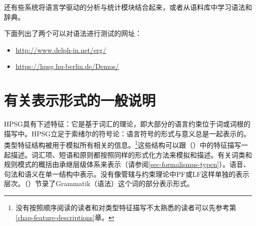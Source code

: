 还有些系统将语言学驱动的分析与统计模块结合起来\citep{Brew95a,MNT2005a-u,MT2008a-u}，或者从语料库中学习语法和辞典\citep{Fouvry2003a-u,CZ2009a-u}。

下面列出了两个可以对语法进行测试的网址：
\begin{itemize}
\item \url{http://www.delph-in.net/erg/}
\item \url{https://hpsg.hu-berlin.de/Demos/}
\end{itemize}


\section{有关表示形式的一般说明}

HPSG具有下述特征：它是基于词汇的理论，即大部分的语言约束位于词或词根的描写中。HPSG立足于索绪尔的符号论：语言符号的形式与意义总是一起表示的。类型特征结构被用于模拟所有相关的信息。\footnote{没有按照顺序阅读的读者和对类型特征描写不太熟悉的读者可以先参考第\ref{chap-feature-descriptions}章。
}这些结构可以跟（）中的特征描写一起描述。词汇项、短语和原则都按照同样的形式化方法来模拟和描述。有关词类和规则模式的概括由承继层级体系来表示（请参阅\ref{sec-formalismus-typen}）。语音、句法和语义在单一结构中表示。没有像管辖与约束理论中PF或LF这样单独的表示层次。（）节录了Grammatik（语法）这个词的部分表示形式。

